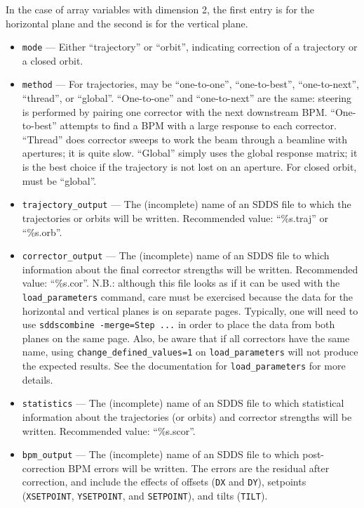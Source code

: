 \documentclass[11pt]{article}
\begin{document}
In the case of array variables with dimension 2, the first entry is for the horizontal plane and the second
is for the vertical plane.

\begin{itemize}

\item \verb|mode| --- Either ``trajectory'' or ``orbit'', indicating
correction of a trajectory or a closed orbit.
\item \verb|method| --- For trajectories, may be ``one-to-one'', ``one-to-best'', ``one-to-next'', ``thread'', or ``global''.  
``One-to-one'' and ``one-to-next'' are the same: steering is performed by pairing one corrector with the next downstream BPM.
``One-to-best'' attempts to find a BPM with a large response to each corrector.  ``Thread'' does corrector sweeps to work the
beam through a beamline with apertures; it is quite slow.  ``Global'' simply uses the global response matrix; it is the best
choice if the trajectory is not lost on an aperture.
For closed orbit, must be ``global''.
\item \verb|trajectory_output| --- The (incomplete) name of an SDDS file to which the trajectories or orbits will be written.  Recommended value: ``\%s.traj'' or ``\%s.orb''.  
\item \verb|corrector_output| --- The (incomplete) name of an SDDS file to which information about the final corrector strengths will be written. Recommended value: ``\%s.cor''.  N.B.: although this file looks as if it can be used with the \verb|load_parameters| command, care must be exercised because the data for the
horizontal and vertical planes is on separate pages. Typically, one will need to use \verb|sddscombine -merge=Step ...| in order to place the data from both planes on the same page. Also, be aware that if all correctors have the same name, using \verb|change_defined_values=1| on \verb|load_parameters| will not produce the expected results. See the documentation for \verb|load_parameters| for more details.
\item \verb|statistics| --- The (incomplete) name of an SDDS file to which statistical information about the
trajectories (or orbits) and corrector strengths will be written.  Recommended value: ``\%s.scor''.
\item \verb|bpm_output| --- The (incomplete) name of an SDDS file to which post-correction BPM errors will be written. The
  errors are the residual after correction, and include the effects of offsets (\verb|DX| and \verb|DY|), setpoints
  (\verb|XSETPOINT|, \verb|YSETPOINT|, and \verb|SETPOINT|), and tilts (\verb|TILT|).

\end{itemize}
\end{document}

